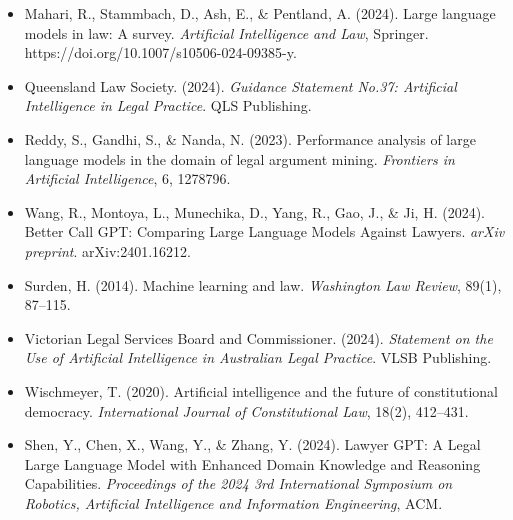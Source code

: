 \documentclass[12pt,a4paper]{article}
\begin{document}
\begin{itemize}[leftmargin=*]
    \item Mahari, R., Stammbach, D., Ash, E., \& Pentland, A. (2024). Large language models in law: A survey. \textit{Artificial Intelligence and Law}, Springer. https://doi.org/10.1007/s10506-024-09385-y.

    \item Queensland Law Society. (2024). \textit{Guidance Statement No.37: Artificial Intelligence in Legal Practice}. QLS Publishing.

    \item Reddy, S., Gandhi, S., \& Nanda, N. (2023). Performance analysis of large language models in the domain of legal argument mining. \textit{Frontiers in Artificial Intelligence}, 6, 1278796.

    \item Wang, R., Montoya, L., Munechika, D., Yang, R., Gao, J., \& Ji, H. (2024). Better Call GPT: Comparing Large Language Models Against Lawyers. \textit{arXiv preprint}. arXiv:2401.16212.

    \item Surden, H. (2014). Machine learning and law. \textit{Washington Law Review}, 89(1), 87–115.

    \item Victorian Legal Services Board and Commissioner. (2024). \textit{Statement on the Use of Artificial Intelligence in Australian Legal Practice}. VLSB Publishing.

    \item Wischmeyer, T. (2020). Artificial intelligence and the future of constitutional democracy. \textit{International Journal of Constitutional Law}, 18(2), 412–431.

    \item Shen, Y., Chen, X., Wang, Y., \& Zhang, Y. (2024). Lawyer GPT: A Legal Large Language Model with Enhanced Domain Knowledge and Reasoning Capabilities. \textit{Proceedings of the 2024 3rd International Symposium on Robotics, Artificial Intelligence and Information Engineering}, ACM.
\end{itemize}
\end{document}
